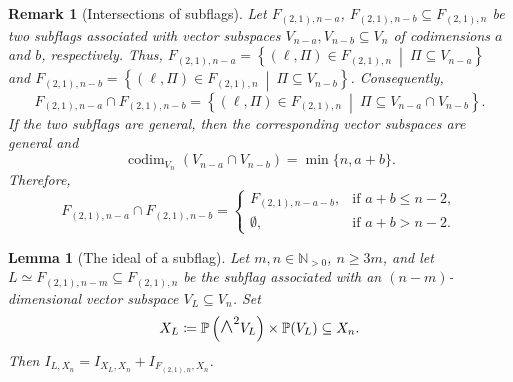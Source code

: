 \documentclass[a4paper,reqno]{amsart}
\theoremstyle{plainnopunct}
\newtheorem{lemma}[lemma]{Lemma}
\theoremstyle{definitionnopunct}
\newtheorem{remark}[remark]{Remark}
\newcommand{\superwedge}{\mathlarger{\mathlarger{\wedge}}}
\renewcommand{\P}{\mathbb{P}}
\newcommand{\N}{\mathbb{N}}
\newcommand{\codim}{\operatorname{codim}}
\begin{document}
\begin{remark}[Intersections of subflags]
\label{flagintersec}
Let $F_{(2,1),n-a}$, $F_{(2,1),n-b}
\subseteq
F_{(2,1),n}$ be two subflags associated with vector subspaces $V_{n-a},V_{n-b}
\subseteq
V_n$ of codimensions $a$ and $b$, respectively. Thus, $F_{(2,1),n-a}
=
\left\{
(\ell,\Pi)\in F_{(2,1),n}
\ \middle|\
\Pi\subseteq V_{n-a}
\right\}$ and 
$F_{(2,1),n-b}
=
\left\{
(\ell,\Pi)\in F_{(2,1),n}
\ \middle|\
\Pi\subseteq V_{n-b}
\right\}$.
Consequently,
\[
F_{(2,1),n-a}
\cap
F_{(2,1),n-b}
=
\left\{
(\ell,\Pi)\in F_{(2,1),n}
\ \middle|\
\Pi\subseteq V_{n-a}\cap V_{n-b}
\right\}.
\]
If the two subflags are general, then the corresponding vector
subspaces are general and
\[
\codim_{V_n}
\left(
V_{n-a}\cap V_{n-b}
\right)
=
\min\{n,a+b\}.
\]
Therefore,
\[
F_{(2,1),n-a}
\cap
F_{(2,1),n-b}
=
\begin{cases}
F_{(2,1),n-a-b},
&
\text{if }a+b\leq n-2,
\\[2pt]
\emptyset,
&
\text{if }a+b>n-2.
\end{cases}
\]
\end{remark}

\begin{lemma}[The ideal of a subflag]
\label{lemma1}
Let $m,n\in\N_{>0}$, $n\geq3m$, and let $L
\simeq
F_{(2,1),n-m}
\subseteq
F_{(2,1),n}$ be the subflag associated with an $(n-m)$-dimensional vector subspace
$
V_L\subseteq V_n$.
Set
\[
X_L
\coloneq
\P\left(\superwedge^2V_L\right)
\times
\P(V_L)
\subseteq
X_n.
\]
Then
$I_{L,X_n}
=
I_{X_L,X_n}
+
I_{F_{(2,1),n},X_n}$.
\end{lemma}
\end{document}
